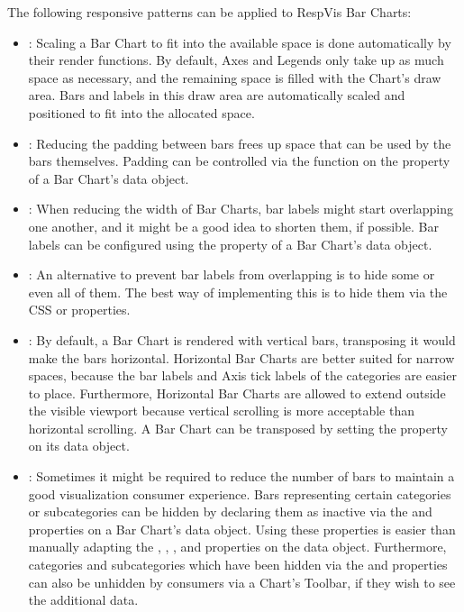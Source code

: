 The following responsive patterns can be applied to RespVis Bar Charts:
\begin{itemize}
\item {}: Scaling a Bar Chart to fit into the
  available space is done automatically by their render functions. By
  default, Axes and Legends only take up as much space as necessary,
  and the remaining space is filled with the Chart's draw area. Bars
  and labels in this draw area are automatically scaled and positioned
  to fit into the allocated space.

\item {}: Reducing the padding between bars
  frees up space that can be used by the bars themselves. Padding
  can be controlled via the  function on the
   property of a Bar Chart's data object.

\item {}: When reducing the width of Bar
  Charts, bar labels might start overlapping one another, and it might
  be a good idea to shorten them, if possible. Bar labels can be
  configured using the  property of a Bar Chart's data
  object.

\item {}: An alternative to prevent bar
  labels from overlapping is to hide some or even all of them. The
  best way of implementing this is to hide them via the CSS
   or  properties.

\item {}: By default, a Bar Chart is rendered
  with vertical bars, transposing it would make the bars horizontal.
  Horizontal Bar Charts are better suited for narrow spaces, because
  the bar labels and Axis tick labels of the categories are easier to
  place. Furthermore, Horizontal Bar Charts are allowed to extend
  outside the visible viewport because vertical scrolling is more
  acceptable than horizontal scrolling. A Bar Chart can be transposed
  by setting the  property on its data object.

\item {}: Sometimes it might be required to reduce
  the number of bars to maintain a good visualization consumer
  experience. Bars representing certain categories or subcategories
  can be hidden by declaring them as inactive via the
   and  properties on
  a Bar Chart's data object. Using these properties is easier than
  manually adapting the , ,
  , and  properties on the data
  object. Furthermore, categories and subcategories which have been
  hidden via the  and
   properties can also be unhidden by
  consumers via a Chart's Toolbar, if they wish to see the additional
  data.


\end{itemize}
